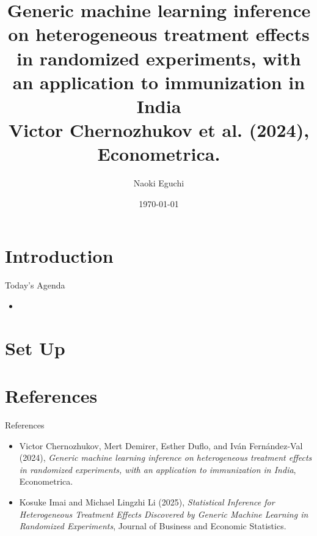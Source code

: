 \documentclass[xcolor=svgnames,aspectratio=169]{beamer}
\begin{document}
 

\title{Generic machine learning inference on heterogeneous treatment effects in randomized experiments, with an application to immunization in India \\ \small{Victor Chernozhukov et al. (2024), Econometrica.}}
\author{Naoki Eguchi}          
\date{\today}

\begin{frame}                  
    \titlepage                     
\end{frame}

\section{Introduction}

\begin{frame}{Today's Agenda}
    \begin{itemize}
        \item 
    \end{itemize}
\end{frame}

\section{Set Up}

\section{References}

\begin{frame}{References}
    \begin{itemize}
        \item Victor Chernozhukov, Mert Demirer, Esther Duflo, and Iván Fernández-Val (2024), \textit{Generic machine learning inference on heterogeneous treatment effects in randomized experiments, with an application to immunization in India}, Econometrica.
        \item Kosuke Imai and Michael Lingzhi Li (2025), \textit{Statistical Inference for Heterogeneous Treatment Effects Discovered by Generic Machine Learning in Randomized Experiments}, Journal of Business and Economic Statistics.
    \end{itemize}
\end{frame}
\end{document}
